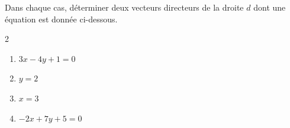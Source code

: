 \begin{exo}{}
	Dans chaque cas, déterminer deux vecteurs directeurs de la droite $d$ dont une équation est donnée ci-dessous.

	\vspace*{-2mm}\begin{multicols}{2}
		\begin{enumerate}
			\item $3x - 4y + 1 = 0$
			\item $y = 2$
			\item $x = 3$
			\item $-2x + 7y + 5 = 0$
		\end{enumerate}
	\end{multicols}
\end{exo}
